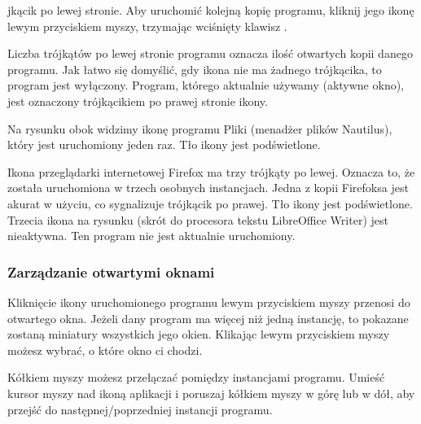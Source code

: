 jkącik po lewej stronie. Aby uruchomić kolejną kopię programu, kliknij jego ikonę lewym przyciskiem myszy, trzymając wciśnięty klawisz .

Liczba trójkątów po lewej stronie programu oznacza ilość otwartych kopii danego programu. Jak łatwo się domyślić, gdy ikona nie ma żadnego trójkącika, to program jest wyłączony. Program, którego aktualnie używamy (aktywne okno), jest oznaczony trójkącikiem po prawej stronie ikony.

Na rysunku obok widzimy ikonę programu Pliki (menadżer plików Nautilus), który jest uruchomiony jeden raz. Tło ikony jest podświetlone.

Ikona przeglądarki internetowej Firefox ma trzy trójkąty po lewej. Oznacza to, że została uruchomiona w trzech osobnych instancjach. Jedna z kopii Firefoksa jest akurat w użyciu, co sygnalizuje trójkącik po prawej. Tło ikony jest podświetlone. Trzecia ikona na rysunku (skrót do procesora tekstu LibreOffice Writer) jest nieaktywna. Ten program nie jest aktualnie uruchomiony.

\subsubsection{Zarządzanie otwartymi oknami}
Kliknięcie ikony uruchomionego programu lewym przyciskiem myszy przenosi do otwartego okna. Jeżeli dany program ma więcej niż jedną instancję, to pokazane zostaną miniatury wszystkich jego okien. Klikając lewym przyciskiem myszy możesz wybrać, o które okno ci chodzi. 

Kółkiem myszy możesz przełączać pomiędzy instancjami programu. Umieść kursor myszy nad ikoną aplikacji i poruszaj kółkiem myszy w górę lub w dół, aby przejść do następnej/poprzedniej instancji programu.

